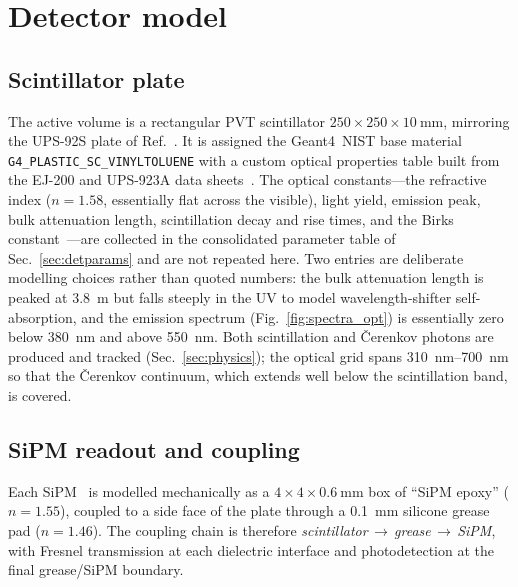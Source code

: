 \documentclass[11pt,a4paper]{article}
\newcommand{\gfour}{Geant4}
\begin{document}
\section{Detector model}
\label{sec:detector}

\subsection{Scintillator plate}

The active volume is a rectangular PVT scintillator
$250 \times 250 \times \SI{10}{\milli\meter}$, mirroring the UPS-92S plate of
Ref.~\cite{Rao2025}. It is assigned the \gfour\ NIST base material
\texttt{G4\_PLASTIC\_SC\_VINYLTOLUENE} with a custom optical properties table
built from the EJ-200 and UPS-923A data
sheets~\cite{EljenEJ200,Artikov2005,AmcrysPS}. The optical constants---the
refractive index ($n = 1.58$, essentially flat across the visible), light yield,
emission peak, bulk attenuation length, scintillation decay and rise times, and
the Birks constant~\cite{Birks1951,Craun1970}---are collected in the
consolidated parameter table of Sec.~\ref{sec:detparams} and are not repeated
here. Two entries are deliberate modelling choices rather than quoted numbers:
the bulk attenuation length is peaked at \SI{3.8}{\meter} but falls steeply in
the UV to model wavelength-shifter self-absorption, and the emission spectrum
(Fig.~\ref{fig:spectra_opt}) is essentially zero below \SI{380}{\nano\meter} and
above \SI{550}{\nano\meter}. Both scintillation and \v{C}erenkov photons are
produced and tracked (Sec.~\ref{sec:physics}); the optical grid spans
\SIrange{310}{700}{\nano\meter} so that the \v{C}erenkov continuum, which extends
well below the scintillation band, is covered.

\subsection{SiPM readout and coupling}

Each SiPM~\cite{Gundacker2020} is modelled mechanically as a
$4 \times 4 \times \SI{0.6}{\milli\meter}$ box of ``SiPM epoxy'' ($n = 1.55$),
coupled to a side face of the plate through a
\SI{0.1}{\milli\meter} silicone grease pad ($n = 1.46$). The coupling chain is
therefore \emph{scintillator\,$\to$\,grease\,$\to$\,SiPM}, with Fresnel
transmission at each dielectric interface and photodetection at the final
grease/SiPM boundary.
\end{document}
